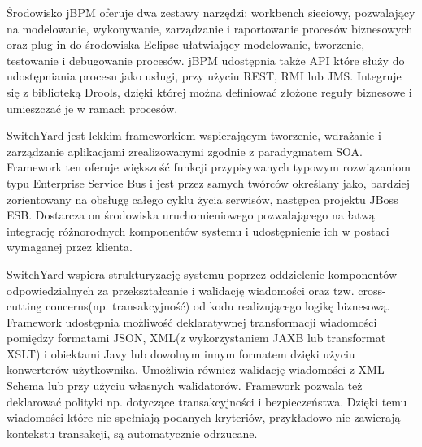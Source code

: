 Środowisko jBPM oferuje dwa zestawy narzędzi: workbench sieciowy, pozwalający na modelowanie, wykonywanie, zarządzanie i raportowanie procesów biznesowych oraz plug-in do środowiska Eclipse ułatwiający modelowanie, tworzenie, testowanie i debugowanie procesów.
jBPM udostępnia także API które służy do udostępniania procesu jako usługi, przy użyciu REST, RMI lub JMS. Integruje się z biblioteką Drools, dzięki której można definiować złożone reguły biznesowe i umieszczać je w ramach procesów.



\label{sec:switchyard}

SwitchYard jest lekkim frameworkiem wspierającym tworzenie, wdrażanie i zarządzanie aplikacjami zrealizowanymi zgodnie z paradygmatem SOA. Framework ten oferuje większość funkcji przypisywanych typowym rozwiązaniom typu Enterprise Service Bus i jest przez samych twórców określany jako, bardziej zorientowany na obsługę całego cyklu życia serwisów, następca projektu JBoss ESB. Dostarcza on środowiska uruchomieniowego pozwalającego na łatwą integrację różnorodnych komponentów systemu i udostępnienie ich w postaci wymaganej przez klienta.

SwitchYard wspiera strukturyzację systemu poprzez oddzielenie komponentów odpowiedzialnych za  przekształcanie i walidację wiadomości oraz tzw. cross-cutting concerns(np. transakcyjność) od kodu realizującego logikę biznesową. Framework udostępnia możliwość deklaratywnej transformacji wiadomości pomiędzy formatami JSON, XML(z wykorzystaniem JAXB lub transformat XSLT) i obiektami Javy lub dowolnym innym formatem dzięki użyciu konwerterów użytkownika. Umożliwia również walidację wiadomości z XML Schema lub przy użyciu własnych walidatorów. Framework pozwala też deklarować polityki np. dotyczące transakcyjności i bezpieczeństwa. Dzięki temu wiadomości które nie spełniają podanych kryteriów, przykładowo nie zawierają kontekstu transakcji, są automatycznie odrzucane. 

